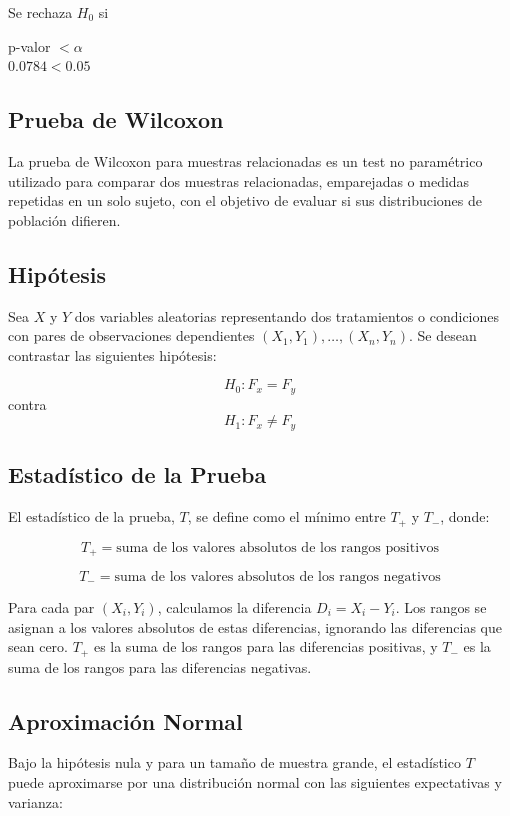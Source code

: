 \documentclass{article}
\begin{document}
Se rechaza $H_0$ si

p-valor $ < \alpha$ \\
$0.0784 < 0.05$

\subsection{Prueba de Wilcoxon}

La prueba de Wilcoxon para muestras relacionadas es un test no paramétrico utilizado para comparar dos muestras relacionadas, emparejadas o medidas repetidas en un solo sujeto, con el objetivo de evaluar si sus distribuciones de población difieren.

\subsection*{Hipótesis}

Sea $X$ y $Y$ dos variables aleatorias representando dos tratamientos o condiciones con pares de observaciones dependientes $(X_1, Y_1),\dots ,(X_n, Y_n)$. Se desean contrastar las siguientes hipótesis:

\[
    H_0: F_x = F_y
\]
contra
\[
    H_1: F_x \neq F_y
\]

\subsection*{Estadístico de la Prueba}

El estadístico de la prueba, $T$, se define como el mínimo entre $T_{+}$ y $T_{-}$, donde:

\[
    T_{+} = \text{suma de los valores absolutos de los rangos positivos}
\]

\[
    T_{-} = \text{suma de los valores absolutos de los rangos negativos}
\]

Para cada par $(X_i, Y_i)$, calculamos la diferencia $D_i = X_i - Y_i$. Los rangos se asignan a los valores absolutos de estas diferencias, ignorando las diferencias que sean cero. $T_{+}$ es la suma de los rangos para las diferencias positivas, y $T_{-}$ es la suma de los rangos para las diferencias negativas.

\subsection*{Aproximación Normal}

Bajo la hipótesis nula y para un tamaño de muestra grande, el estadístico $T$ puede aproximarse por una distribución normal con las siguientes expectativas y varianza:
\end{document}
